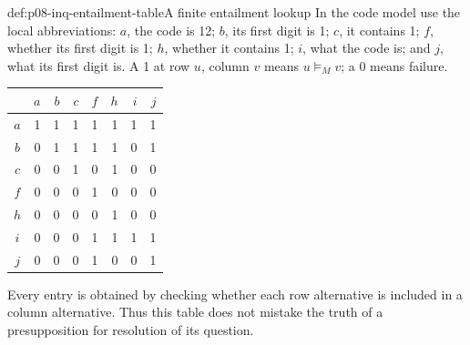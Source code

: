 \begin{hbexample}{def:p08-inq-entailment-table}{A finite entailment lookup}
In the code model use the local abbreviations: \(a\), the code is 12;
\(b\), its first digit is 1; \(c\), it contains 1; \(f\), whether its
first digit is 1; \(h\), whether it contains 1; \(i\), what the code is;
and \(j\), what its first digit is. A 1 at row \(u\), column \(v\)
means \(u\models_M v\); a 0 means failure.
\begin{center}
\begin{tabular}{c|rrrrrrr}
 &\(a\)&\(b\)&\(c\)&\(f\)&\(h\)&\(i\)&\(j\)\\\hline
\(a\)&1&1&1&1&1&1&1\\
\(b\)&0&1&1&1&1&0&1\\
\(c\)&0&0&1&0&1&0&0\\
\(f\)&0&0&0&1&0&0&0\\
\(h\)&0&0&0&0&1&0&0\\
\(i\)&0&0&0&1&1&1&1\\
\(j\)&0&0&0&1&0&0&1
\end{tabular}
\end{center}
Every entry is obtained by checking whether each row alternative is
included in a column alternative. Thus this table does not mistake the
truth of a presupposition for resolution of its question.
\end{hbexample}

